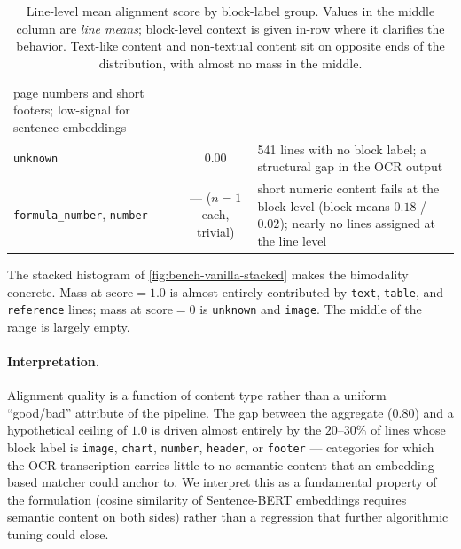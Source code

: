 \documentclass{article}
\theoremstyle{definition}
\begin{document}
\begin{table}[h]
\begin{tabular}{@{}p{4.3cm}cp{6.3cm}@{}}
            page numbers and short footers; low-signal for sentence
            embeddings                                                                               \\[2pt]
            \texttt{unknown}                          & 0.00               &
            541 lines with no block label; a structural gap in the
            OCR output                                                                               \\[2pt]
            \texttt{formula\_number}, \texttt{number} &
            --- ($n{=}1$ each, trivial)               &
            short numeric content fails at the block level (block
            means $0.18$ / $0.02$); nearly no lines assigned at the
            line level                                                                               \\
            \bottomrule
      \end{tabular}
      \caption{Line-level mean alignment score by block-label group.
            Values in the middle column are \emph{line means}; block-level
            context is given in-row where it clarifies the behavior.
            Text-like content and non-textual content sit on opposite
            ends of the distribution, with almost no mass in the
            middle.}
      \label{tab:bench-vanilla-bimodality}
\end{table}

The stacked histogram of \cref{fig:bench-vanilla-stacked} makes the
bimodality concrete.  Mass at $\mathrm{score} = 1.0$ is almost
entirely contributed by \texttt{text}, \texttt{table}, and
\texttt{reference} lines; mass at $\mathrm{score} = 0$ is
\texttt{unknown} and \texttt{image}.  The middle of the range is
largely empty.

\paragraph{Interpretation.}
Alignment quality is a function of content type rather than a uniform
``good/bad'' attribute of the pipeline.  The gap between the aggregate
($0.80$) and a hypothetical ceiling of $1.0$ is driven almost entirely
by the $20$--$30\%$ of lines whose block label is
\texttt{image}, \texttt{chart}, \texttt{number}, \texttt{header}, or
\texttt{footer} --- categories for which the OCR transcription carries
little to no semantic content that an embedding-based matcher could
anchor to.  We interpret this as a fundamental property of the
formulation (cosine similarity of Sentence-BERT embeddings requires
semantic content on both sides) rather than a regression that further
algorithmic tuning could close.
\end{document}
